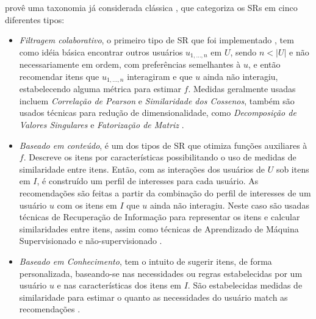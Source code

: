 \documentclass[normaltoc, espacoumemeio, pnumromarab,ruledheader]{abnt}
\begin{document}
 provê uma taxonomia já considerada clássica , que categoriza os SRs em cinco diferentes tipos:
\begin{itemize}
 \item \textit{Filtragem colaborativo}, o primeiro tipo de SR que foi implementado \cite{Resnick1997}, tem como idéia básica encontrar outros usuários $u_{1,\dots,n}$ em $U$, sendo $n < |U|$ e não necessariamente em ordem, com preferências semelhantes à $u$, e então recomendar itens que $u_{1,\dots,n}$ interagiram e que $u$ ainda não interagiu, estabelecendo alguma métrica para estimar $f$. Medidas geralmente usadas incluem \textit{Correlação de Pearson} e \textit{Similaridade dos Cossenos}, também são usados técnicas para redução de dimensionalidade, como \textit{Decomposição de Valores Singulares} e \textit{Fatorização de Matriz} \cite{Jannach2011}.
 \item \textit{Baseado em conteúdo}, é um dos tipos de SR que otimiza funções auxiliares à $f$. Descreve os itens por características possibilitando o uso de medidas de similaridade entre itens. Então, com as interações dos usuários de $U$ sob itens em $I$, é construído um perfil de interesses para cada usuário. As recomendações são feitas a partir da combinação do perfil de interesses de um usuário $u$ com os itens em $I$ que $u$ ainda não interagiu. Neste caso são usadas técnicas de Recuperação de Informação \cite{Jannach2011} para representar os itens e calcular similaridades entre itens, assim como técnicas de Aprendizado de Máquina Supervisionado e não-supervisionado \cite{Jannach2011,Burke2002}.
 \item \textit{Baseado em Conhecimento}, tem o intuito de sugerir itens, de forma personalizada, baseando-se nas necessidades ou regras estabelecidas por um usuário $u$ e nas características dos itens em $I$. São estabelecidas medidas de similaridade para estimar o quanto as necessidades do usuário match as recomendações \cite{Jannach2011,Lops2011,Burke2007}.

\end{itemize}
\end{document}
